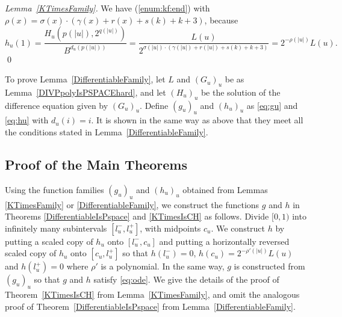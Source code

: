\begin{proof}[Lemma~\ref{KTimesFamily}]
We have (\ref{enum:kf:end}) with
  $\rho(x) = \sigma(x) \cdot (\gamma(x)+r(x)+s(k)+k+3)$, because
  \begin{equation}
   h_u(1) = \frac{H_u(p(|u|), 2^{q(|u|)})}{B^{d_u(p(|u|))}} 
          = \frac{L(u)}{2^{\sigma(|u|) \cdot (\gamma(|u|)+r(|u|)+s(k)+k+3)}}
	  = 2^{-\rho(|u|)} L(u).
  \end{equation}
\qed
\end{proof}



 To prove Lemma~\ref{DifferentiableFamily}, 
 let $L$ and $(G_u)_u$ be as Lemma~\ref{DIVPpolyIsPSPACEhard},
 and let $(H_u)_u$ be the solution of the difference equation given by $(G_u)_u$.
 Define $(g_u)_u$ and $(h_u)_u$ as \eqref{eq:gu} and \eqref{eq:hu}
 with $d_u(i) = i$.
 It is shown in the same way as above that they meet all the conditions
 stated in Lemma~\ref{DifferentiableFamily}.


\subsection{Proof of the Main Theorems}
\label{subsection: proof of theorems}
Using the function families $(g_u)_u$ and $(h_u)_u$ 
obtained from Lemmas \ref{KTimesFamily} or \ref{DifferentiableFamily}, 
we construct the functions $g$ and $h$ in 
Theorems \ref{DifferentiableIsPspace} and \ref{KTimesIsCH} as follows. 
Divide $[0,1)$ into infinitely many subintervals $[l^-_u, l^+_u]$,
with midpoints $c_u$.
We construct $h$ by putting a scaled copy of $h_u$ onto $[l^-_u, c_u]$ and
putting a horizontally reversed scaled copy of $h_u$ onto $[c_u, l^+_u]$ 
so that $h(l^-_u) = 0$, $h(c_u) = 2^{-\rho'(|u|)} L(u)$ and $h(l^+_u) = 0$ where $\rho'$ is a polynomial.
In the same way, $g$ is constructed from $(g_u)_u$ so that $g$ and $h$ satisfy \eqref{eq:ode}.
We give the details of the proof of 
Theorem~\ref{KTimesIsCH} from Lemma~\ref{KTimesFamily}, 
and omit the analogous proof of Theorem~\ref{DifferentiableIsPspace} 
from Lemma~\ref{DifferentiableFamily}. 


